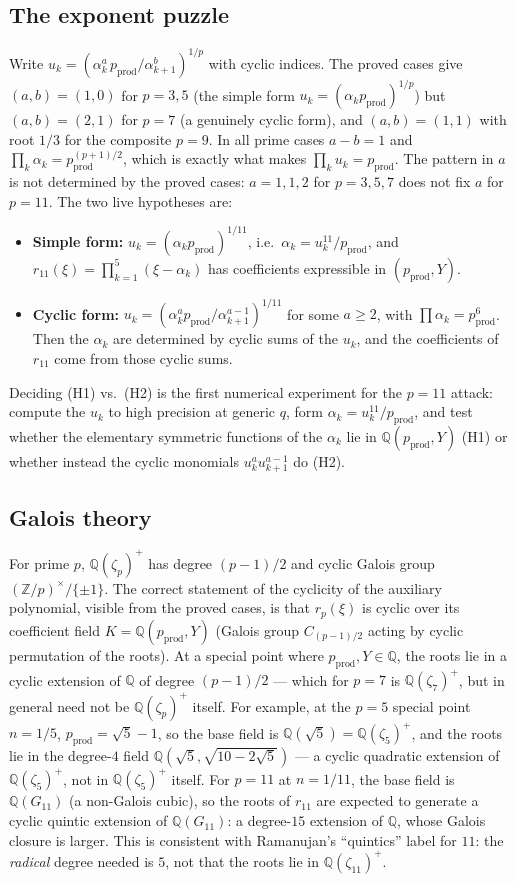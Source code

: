 \documentclass[11pt]{amsart}
\theoremstyle{plain}
\theoremstyle{definition}
\theoremstyle{remark}
\newcommand{\Z}{\mathbb{Z}}
\newcommand{\Q}{\mathbb{Q}}
\newcommand{\pprod}{p_{\mathrm{prod}}}
\begin{document}
\subsection{The exponent puzzle}
\label{sec:exponent}

Write $u_k = (\alpha_k^a\,\pprod/\alpha_{k+1}^b)^{1/p}$ with cyclic indices. The
proved cases give $(a,b) = (1,0)$ for $p=3,5$ (the simple form
$u_k = (\alpha_k\pprod)^{1/p}$) but $(a,b) = (2,1)$ for $p=7$ (a genuinely cyclic
form), and $(a,b) = (1,1)$ with root $1/3$ for the composite $p=9$. In all prime
cases $a-b=1$ and $\prod_k \alpha_k = \pprod^{(p+1)/2}$, which is exactly what
makes $\prod_k u_k = \pprod$. The pattern in $a$ is not determined by the proved
cases: $a = 1,1,2$ for $p=3,5,7$ does not fix $a$ for $p=11$. The two live
hypotheses are:
\begin{itemize}
\item[(H1)] \textbf{Simple form:} $u_k = (\alpha_k\pprod)^{1/11}$, i.e.\
$\alpha_k = u_k^{11}/\pprod$, and $r_{11}(\xi) = \prod_{k=1}^5(\xi-\alpha_k)$
has coefficients expressible in $(\pprod, Y)$.
\item[(H2)] \textbf{Cyclic form:} $u_k = (\alpha_k^a\pprod/\alpha_{k+1}^{a-1})^{1/11}$
for some $a \geq 2$, with $\prod \alpha_k = \pprod^6$. Then the $\alpha_k$ are
determined by cyclic sums of the $u_k$, and the coefficients of $r_{11}$ come
from those cyclic sums.
\end{itemize}
Deciding (H1) vs.\ (H2) is the first numerical experiment for the $p=11$ attack:
compute the $u_k$ to high precision at generic $q$, form $\alpha_k = u_k^{11}/\pprod$,
and test whether the elementary symmetric functions of the $\alpha_k$ lie in
$\Q(\pprod, Y)$ (H1) or whether instead the cyclic monomials $u_k^a u_{k+1}^{a-1}$
do (H2).

\subsection{Galois theory}
\label{sec:galois}

For prime $p$, $\Q(\zeta_p)^+$ has degree $(p-1)/2$ and cyclic Galois group
$(\Z/p)^\times/\{\pm 1\}$. The correct statement of the cyclicity of the auxiliary
polynomial, visible from the proved cases, is that $r_p(\xi)$ is cyclic over its
coefficient field $K = \Q(\pprod, Y)$ (Galois group $C_{(p-1)/2}$ acting by cyclic
permutation of the roots). At a special point where $\pprod, Y \in \Q$, the roots
lie in a cyclic extension of $\Q$ of degree $(p-1)/2$ --- which for $p=7$ is
$\Q(\zeta_7)^+$, but in general need not be $\Q(\zeta_p)^+$ itself. For example, at
the $p=5$ special point $n=1/5$, $\pprod = \sqrt5-1$, so the base field is
$\Q(\sqrt5) = \Q(\zeta_5)^+$, and the roots lie in the degree-$4$ field
$\Q(\sqrt5,\sqrt{10-2\sqrt5})$ --- a cyclic quadratic extension of
$\Q(\zeta_5)^+$, not in $\Q(\zeta_5)^+$ itself. For $p=11$ at $n=1/11$, the base
field is $\Q(G_{11})$ (a non-Galois cubic), so the roots of $r_{11}$ are expected to
generate a cyclic quintic extension of $\Q(G_{11})$: a degree-$15$ extension of
$\Q$, whose Galois closure is larger. This is consistent with Ramanujan's
``quintics'' label for $11$: the \emph{radical} degree needed is $5$, not that the
roots lie in $\Q(\zeta_{11})^+$.
\end{document}
